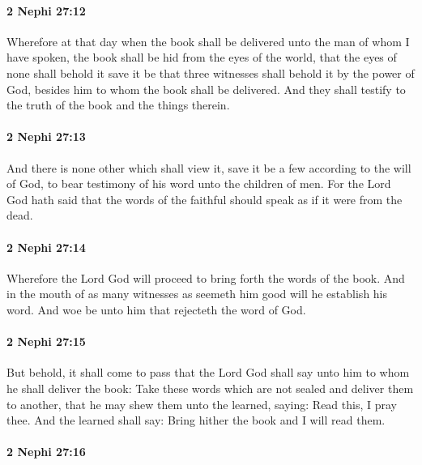 		\paragraph{2 Nephi 27:12} %
			\label{2NEPHI-27-12}

			Wherefore at that day when the book shall be delivered
			unto the man of whom I have spoken,
			the book shall be hid from the eyes of the world,
			that the eyes of none shall behold it
			save it be that three witnesses shall behold it by the power of God,
			besides him to whom the book shall be delivered.
			And they shall testify to the truth of the book and the things therein.

		\paragraph{2 Nephi 27:13} %
			\label{2NEPHI-27-13}

			And there is none other which shall view it,
			save it be a few according to the will of God,
			to bear testimony of his word unto the children of men.
			For the Lord God hath said
			that the words of the faithful should speak as if it were from the dead.

		\paragraph{2 Nephi 27:14} %
			\label{2NEPHI-27-14}

			Wherefore the Lord God will proceed to bring forth the words of the book.
			And in the mouth of as many witnesses as seemeth him good
			will he establish his word.
			And woe be unto him that rejecteth the word of God.

		\paragraph{2 Nephi 27:15} %
			\label{2NEPHI-27-15}

			But behold, it shall come to pass that
			the Lord God shall say unto him to whom he shall deliver the book:
			Take these words which are not sealed and deliver them to another,
			that he may shew them unto the learned, saying:
			Read this, I pray thee.
			And the learned shall say:
			Bring hither the book and I will read them.

		\paragraph{2 Nephi 27:16} %
			\label{2NEPHI-27-16}

